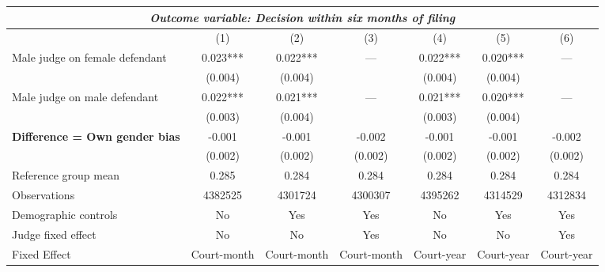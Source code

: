 {
\def\sym#1{\ifmmode^{#1}\else\(^{#1}\)\fi}
\begin{tabular}{l*{6}{c}}
  \hline\hline
\multicolumn{7}{c}{\textit{Outcome variable: Decision within six months of filing}}\\
\hline
&\multicolumn{1}{c}{(1)}&\multicolumn{1}{c}{(2)}&\multicolumn{1}{c}{(3)}&\multicolumn{1}{c}{(4)}&\multicolumn{1}{c}{(5)}&\multicolumn{1}{c}{(6)}\\
\hline
Male judge on female defendant \hspace{15mm} & 0.023*** & 0.022*** & --- & 0.022*** & 0.020*** & --- \\
& (0.004) & (0.004) &  & (0.004) &(0.004) &  \\
Male judge on male defendant \hspace{15mm} & 0.022*** & 0.021*** & ---& 0.021*** & 0.020*** & --- \\
& (0.003) & (0.004) &  & (0.003) & (0.004) &  \\
\textbf{Difference = Own gender bias} \hspace{15mm} & -0.001 & -0.001 & -0.002 & -0.001 & -0.001 & -0.002 \\
& (0.002) & (0.002) & (0.002) & (0.002) & (0.002) & (0.002) \\
\hline
Reference group mean & 0.285 & 0.284 & 0.284 & 0.284 & 0.284 & 0.284 \\
Observations & 4382525 & 4301724 & 4300307 & 4395262 & 4314529 & 4312834 \\
Demographic controls & No & Yes & Yes & No & Yes & Yes \\
Judge fixed effect & No & No & Yes & No & No & Yes \\
Fixed Effect & Court-month & Court-month & Court-month & Court-year & Court-year & Court-year \\
\hline\hline
\end{tabular}
}
 
